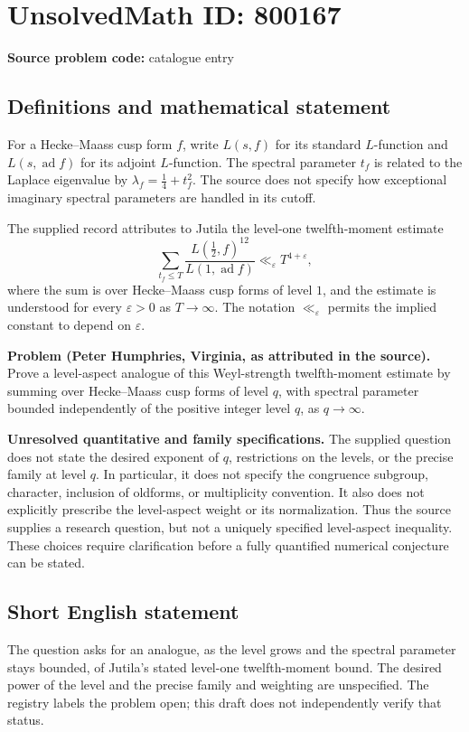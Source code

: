 \documentclass[11pt]{article}
\begin{document}
\section*{UnsolvedMath ID: 800167}
\textbf{Source problem code:} catalogue entry
\subsection{Definitions and mathematical statement}
For a Hecke--Maass cusp form \(f\), write \(L(s,f)\) for its standard \(L\)-function and \(L(s,\operatorname{ad}f)\) for its adjoint \(L\)-function. The spectral parameter \(t_f\) is related to the Laplace eigenvalue by \(\lambda_f=\tfrac14+t_f^2\). The source does not specify how exceptional imaginary spectral parameters are handled in its cutoff.

The supplied record attributes to Jutila the level-one twelfth-moment estimate
\[
\sum_{t_f\leq T}\frac{L\!\left(\tfrac12,f\right)^{12}}{L(1,\operatorname{ad}f)}
\ll_{\varepsilon}T^{4+\varepsilon},
\]
where the sum is over Hecke--Maass cusp forms of level \(1\), and the estimate is understood for every \(\varepsilon>0\) as \(T\to\infty\). The notation \(\ll_{\varepsilon}\) permits the implied constant to depend on \(\varepsilon\).

\textbf{Problem (Peter Humphries, Virginia, as attributed in the source).} Prove a level-aspect analogue of this Weyl-strength twelfth-moment estimate by summing over Hecke--Maass cusp forms of level \(q\), with spectral parameter bounded independently of the positive integer level \(q\), as \(q\to\infty\).

\textbf{Unresolved quantitative and family specifications.} The supplied question does not state the desired exponent of \(q\), restrictions on the levels, or the precise family at level \(q\). In particular, it does not specify the congruence subgroup, character, inclusion of oldforms, or multiplicity convention. It also does not explicitly prescribe the level-aspect weight or its normalization. Thus the source supplies a research question, but not a uniquely specified level-aspect inequality. These choices require clarification before a fully quantified numerical conjecture can be stated.
\subsection{Short English statement}
The question asks for an analogue, as the level grows and the spectral parameter stays bounded, of Jutila's stated level-one twelfth-moment bound. The desired power of the level and the precise family and weighting are unspecified. The registry labels the problem open; this draft does not independently verify that status.
\end{document}
